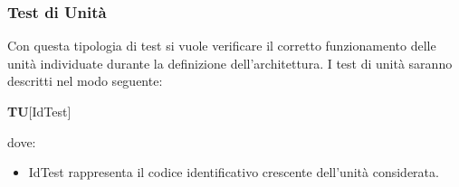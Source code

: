 \subsubsection{Test di Unità}
Con questa tipologia di test si vuole verificare il corretto funzionamento delle unità individuate durante la definizione dell'architettura.
I test di unità saranno descritti nel modo seguente:
\begin{center}
\textbf{TU}[IdTest]
\end{center}
dove:
\begin{itemize}
\item IdTest rappresenta il codice identificativo crescente dell'unità considerata.
\end{itemize}

